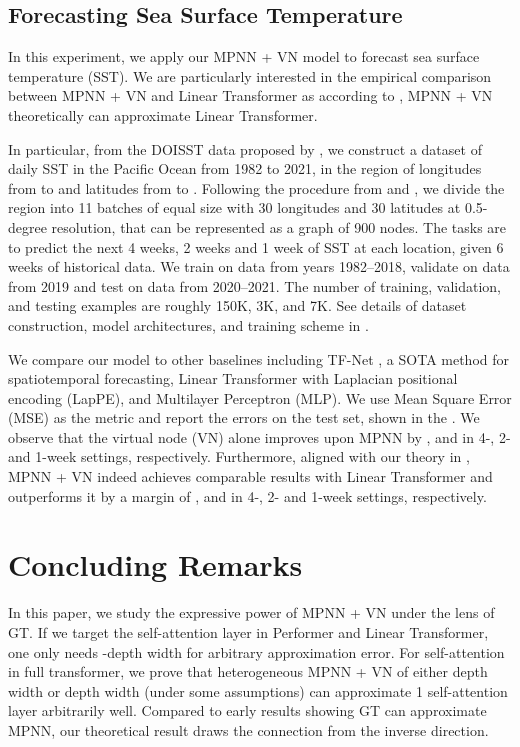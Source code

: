 \documentclass[nohyperref]{article}
\theoremstyle{plain}
\theoremstyle{definition}
\theoremstyle{remark}
\begin{document}
\subsection{Forecasting Sea Surface Temperature} \label{sec:climate}

In this experiment, we apply our MPNN + VN model to forecast sea surface temperature (SST). We are particularly interested in the empirical comparison between MPNN + VN and Linear Transformer \citep{katharopoulos-et-al-2020} as according to , MPNN + VN theoretically can approximate Linear Transformer.

In particular, from the DOISST data proposed by \citep{ImprovementsoftheDailyOptimumInterpolationSeaSurfaceTemperatureDOISSTVersion21}, we construct a dataset of daily SST in the Pacific Ocean from 1982 to 2021, in the region of longitudes from  to  and latitudes from  to . Following the procedure from \citep{de2018deep,deBezenac2019} and \citet{wang2022metalearning}, we divide the region into 11 batches of equal size with 30 longitudes and 30 latitudes at 0.5-degree resolution, that can be represented as a graph of 900 nodes. 
The tasks are to predict the next 4 weeks, 2 weeks and 1 week of SST at each location, given 6 weeks of historical data. We train on data from years 1982--2018, validate on data from 2019 and test on data from 2020--2021. The number of training, validation, and testing examples are roughly 150K, 3K, and 7K. See details of dataset construction, model architectures, and training scheme in . 



We compare our model to other baselines including TF-Net \cite{Rui2020}, a SOTA method for spatiotemporal forecasting, Linear Transformer \citep{katharopoulos-et-al-2020,wang2020linformer} with Laplacian positional encoding (LapPE), and Multilayer Perceptron (MLP). We use Mean Square Error (MSE) as the metric and report the errors on the test set, shown in the . 
We observe that the virtual node (VN) alone improves upon MPNN by ,  and  in 4-, 2- and 1-week settings, respectively. Furthermore, aligned with our theory in , MPNN + VN indeed achieves comparable results with Linear Transformer and outperforms it by a margin of ,  and  in 4-, 2- and 1-week settings, respectively.




\section{Concluding Remarks}
In this paper, we study the expressive power of MPNN + VN under the lens of GT. If we target the self-attention layer in Performer and Linear Transformer, one only needs -depth  width for arbitrary approximation error. 
For self-attention in full transformer, we prove that heterogeneous MPNN + VN of either  depth  width or  depth  width (under some assumptions) can approximate 1 self-attention layer arbitrarily well. 
Compared to early results \citep{kim2022pure} showing GT can approximate MPNN, our theoretical result draws the connection from the inverse direction. 
\end{document}
